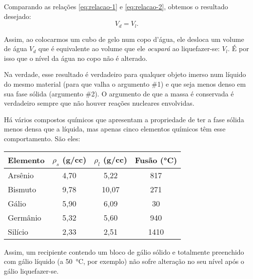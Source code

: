 \documentclass[a4paper,12pt]{article}
\begin{document}
  Comparando as relações \eqref{eq:relacao-1} e \eqref{eq:relacao-2}, obtemos o resultado desejado:
  \begin{equation*}
    V_{d} = V_{l}.
  \end{equation*}

  Assim, ao colocarmos um cubo de gelo num copo d'água, ele desloca um volume de água $V_{d}$ que é equivalente ao volume que ele \emph{ocupará} ao liquefazer-se: $V_{l}$.
  É por isso que o nível da água no copo não é alterado.
  
  Na verdade, esse resultado é verdadeiro para qualquer objeto imerso num líquido do mesmo material (para que valha o argumento \#1) e que seja menos denso em sua fase sólida (argumento \#2).
  O argumento de que a massa é conservada é verdadeiro sempre que não houver reações nucleares envolvidas.
  
  Há vários compostos químicos que apresentam a propriedade de ter a fase sólida menos densa que a líquida, mas apenas cinco elementos químicos têm esse comportamento. São eles:
  
  \begin{center}
  \begin{tabular}{lccc}
  \toprule
  Elemento & $\rho_s$ (\si{g/cc}) & $\rho_l$ (\si{g/cc}) & Fusão (\si{\degreeCelsius})\\
  \midrule
  Arsênio & 4,70 & 5,22 & 817 \\
  Bismuto & 9,78 & 10,07 & 271\\
  Gálio   & 5,90 & 6,09 & 30 \\
  Germânio & 5,32 & 5,60 & 940 \\
  Silício & 2,33 & 2,51 & 1410\\
  \bottomrule
  \end{tabular}%
  \end{center}
  
  Assim, um recipiente contendo um bloco de gálio sólido e totalmente preenchido com gálio líquido (a \SI{50}{\degreeCelsius}, por exemplo) não sofre alteração no seu nível após o gálio liquefazer-se.
  
  
  
  
\end{document}
